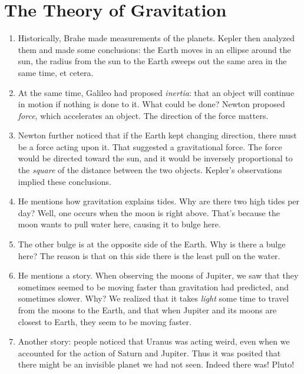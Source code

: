 \section{The Theory of Gravitation}

\begin{enumerate}

  \item Historically, Brahe made measurements of the planets. Kepler
  then analyzed them and made some conclusions: the Earth moves in an
  ellipse around the sun, the radius from the sun to the Earth sweeps
  out the same area in the same time, et cetera.

  \item At the same time, Galileo had proposed \emph{inertia}: that an
  object will continue in motion if nothing is done to it. What could be
  done? Newton proposed \emph{force}, which accelerates an object. The
  direction of the force matters.

  \item Newton further noticed that if the Earth kept changing
  direction, there must be a force acting upon it. That suggested a
  gravitational force. The force would be directed toward the sun, and
  it would be inversely proportional to the \emph{square} of the
  distance between the two objects. Kepler's observations implied these
  conclusions.

  \item He mentions how gravitation explains tides. Why are there two
  high tides per day? Well, one occurs when the moon is right above.
  That's because the moon wants to pull water here, causing it to bulge
  here.

  \item The other bulge is at the opposite side of the Earth. Why is
  there a bulge here? The reason is that on this side there is the least
  pull on the water.

  \item He mentions a story. When observing the moons of Jupiter, we saw
  that they sometimes seemed to be moving faster than gravitation had
  predicted, and sometimes slower. Why? We realized that it takes
  \emph{light} some time to travel from the moons to the Earth, and that
  when Jupiter and its moons are closest to Earth, they seem to be
  moving faster.

  \item Another story: people noticed that Uranus was acting weird, even
  when we accounted for the action of Saturn and Jupiter. Thus it was
  posited that there might be an invisible planet we had not seen.
  Indeed there was! Pluto!


\end{enumerate}

